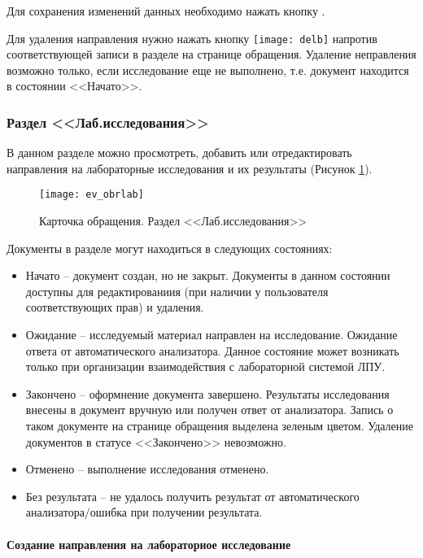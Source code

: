 {{Для сохранения изменений данных необходимо нажать кнопку .

Для удаления направления нужно нажать кнопку \texttt{[image: delb]} напротив соответствующей записи в разделе  на странице обращения. Удаление неправления возможно только, если исследование еще не выполнено, т.е. документ находится в состоянии <<Начато>>.
}{}

\subsubsection{Раздел <<Лаб.исследования>>}

В данном разделе можно просмотреть, добавить или отредактировать направления на лабораторные исследования и их результаты (Рисунок \ref{img_ev_obrlab}).

\begin{figure}[ht]\centering
 \texttt{[image: ev\_obrlab]}
 \caption{Карточка обращения. Раздел <<Лаб.исследования>>}
 \label{img_ev_obrlab}
\end{figure}

Документы  в разделе  могут находиться в следующих состояниях:
\begin{itemize}
 \item Начато -- документ создан, но не закрыт. Документы в данном состоянии доступны для редактированиия (при наличии у пользователя соответствующих прав) и удаления. 
 \item Ожидание -- исследуемый материал направлен на исследование. Ожидание ответа от автоматического анализатора. Данное состояние может возникать только при организации взаимодействия \tmisr с лабораторной системой ЛПУ.
 \item Закончено -- оформнение документа завершено. Результаты исследования внесены в документ вручную или получен ответ от анализатора. Запись о таком документе на странице обращения выделена зеленым цветом. Удаление документов в статусе <<Закончено>> невозможно.
 \item Отменено -- выполнение исследования отменено.
 \item Без результата -- не удалось получить результат от автоматического анализатора$\slash$ошибка при получении результата.
\end{itemize}

\paragraph{Создание направления на лабораторное исследование}

}

